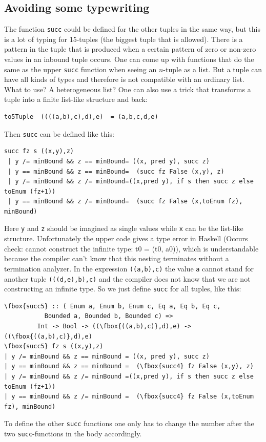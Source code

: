 \documentclass{tmr}
\newcommand{\authornote}[3]{{\color{#2} {\sc #1}: #3}}
\newcommand\bay[1]{\authornote{edward}{blue}{#1}}
\newcommand\tkv[1]{\authornote{Tillmann}{green}{#1}}
\begin{document}
\subsection{Avoiding some typewriting}


The function \verb|succ| could be defined for the other tuples in the same way, but this is a lot of typing for 15-tuples (the biggest tuple that is allowed). 
There is a pattern in the tuple that is produced when a certain pattern of zero or non-zero values in an inbound tuple occurs.
One can come up with functions that do the same as the upper \verb|succ| function when seeing an $n$-tuple as a list.
But a tuple can have all kinds of types and therefore is not compatible with an ordinary list. What to use? A heterogeneous list? One can also use a trick that transforms a tuple into a finite list-like structure and back:

\begin{Verbatim}
to5Tuple  ((((a,b),c),d),e)  = (a,b,c,d,e)
\end{Verbatim}

Then \verb|succ| can be defined like this:
\begin{Verbatim}
succ fz s ((x,y),z)
 | y /= minBound && z == minBound= ((x, pred y), succ z)
 | y == minBound && z == minBound=  (succ fz False (x,y), z)
 | y /= minBound && z /= minBound=((x,pred y), if s then succ z else toEnum (fz+1))
 | y == minBound && z /= minBound=  (succ fz False (x,toEnum fz), minBound)
\end{Verbatim}
Here \verb|y| and \verb|z| should be imagined as single values while \verb|x| can be the list-like structure. 
Unfortunately the upper code gives a type error in Haskell (Occurs check: cannot construct the infinite type: t0 = (t0, a0)), which is understandable because the compiler can't know that this nesting terminates without a termination analyzer. In the expression \verb|((a,b),c)|  the value \verb|a| cannot stand for another tuple \eg \verb|(((d,e),b),c)| and the compiler does not know that we are not constructing an infinite type.
So we just define \verb|succ| for all tuples, like this:

\begin{Verbatim}[commandchars=\\\{\}]
\fbox{succ5} :: ( Enum a, Enum b, Enum c, Eq a, Eq b, Eq c,
           Bounded a, Bounded b, Bounded c) =>
         Int -> Bool -> ((\fbox{((a,b),c)},d),e) -> ((\fbox{((a,b),c)},d),e)
\fbox{succ5} fz s ((x,y),z)
| y /= minBound && z == minBound = ((x, pred y), succ z)
| y == minBound && z == minBound =  (\fbox{succ4} fz False (x,y), z)
| y /= minBound && z /= minBound =((x,pred y), if s then succ z else toEnum (fz+1))
| y == minBound && z /= minBound =  (\fbox{succ4} fz False (x,toEnum fz), minBound)
\end{Verbatim}
To define the other \verb|succ| functions one only has to change the number after the two \verb|succ|-functions in the body accordingly. 
\end{document}
